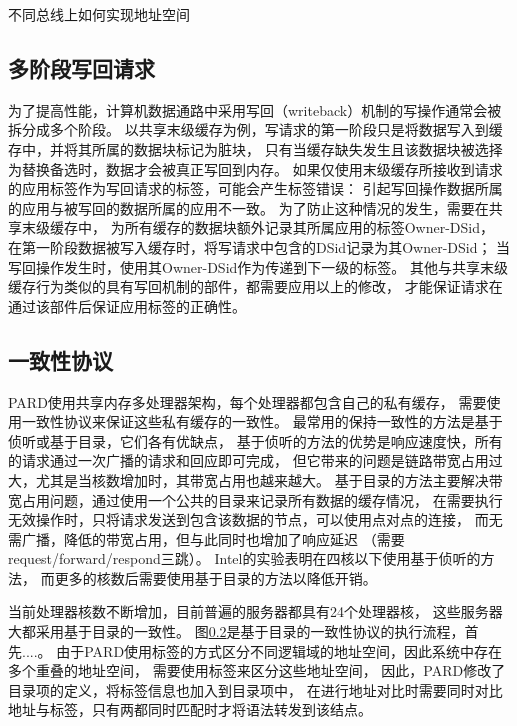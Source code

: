 不同总线上如何实现地址空间




\subsection{多阶段写回请求}

为了提高性能，计算机数据通路中采用写回（writeback）机制的写操作通常会被拆分成多个阶段。
以共享末级缓存为例，写请求的第一阶段只是将数据写入到缓存中，并将其所属的数据块标记为脏块，
只有当缓存缺失发生且该数据块被选择为替换备选时，数据才会被真正写回到内存。
如果仅使用末级缓存所接收到请求的应用标签作为写回请求的标签，可能会产生标签错误：
引起写回操作数据所属的应用与被写回的数据所属的应用不一致。
为了防止这种情况的发生，需要在共享末级缓存中，
为所有缓存的数据块额外记录其所属应用的标签Owner-DSid，
在第一阶段数据被写入缓存时，将写请求中包含的DSid记录为其Owner-DSid；
当写回操作发生时，使用其Owner-DSid作为传递到下一级的标签。
其他与共享末级缓存行为类似的具有写回机制的部件，都需要应用以上的修改，
才能保证请求在通过该部件后保证应用标签的正确性。


\subsection{一致性协议}

PARD使用共享内存多处理器架构，每个处理器都包含自己的私有缓存，
需要使用一致性协议来保证这些私有缓存的一致性。
最常用的保持一致性的方法是基于侦听或基于目录，它们各有优缺点，
基于侦听的方法的优势是响应速度快，所有的请求通过一次广播的请求和回应即可完成，
但它带来的问题是链路带宽占用过大，尤其是当核数增加时，其带宽占用也越来越大。
基于目录的方法主要解决带宽占用问题，通过使用一个公共的目录来记录所有数据的缓存情况，
在需要执行无效操作时，只将请求发送到包含该数据的节点，可以使用点对点的连接，
而无需广播，降低的带宽占用，但与此同时也增加了响应延迟
（需要request/forward/respond三跳）。
Intel的实验\cite{}表明在四核以下使用基于侦听的方法，
而更多的核数后需要使用基于目录的方法以降低开销。

当前处理器核数不断增加，目前普遍的服务器都具有24个处理器核，
这些服务器大都采用基于目录的一致性。
图\ref{}是基于目录的一致性协议的执行流程，首先....。
由于PARD使用标签的方式区分不同逻辑域的地址空间，因此系统中存在多个重叠的地址空间，
需要使用标签来区分这些地址空间，
因此，PARD修改了目录项的定义，将标签信息也加入到目录项中，
在进行地址对比时需要同时对比地址与标签，只有两都同时匹配时才将语法转发到该结点。

